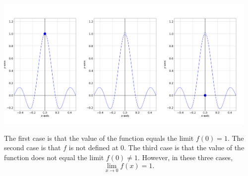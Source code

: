 \documentclass[11pt]{book}
\begin{document}
\begin{center}
    \includegraphics[width=0.32\textwidth]{defined_or_not_1.png}\includegraphics[width=0.32\textwidth]{defined_or_not_2.png}\includegraphics[width=0.32\textwidth]{defined_or_not_3.png}
\end{center}

The first case is that the value of the function equals the limit $f(0)=1$. The second case is that $f$ is not defined at $0$. The third case is that the value of the function does not equal the limit $f(0)\ne 1$. However, in these three cases, $$\lim_{x\to 0}f(x)=1.$$
\end{document}
